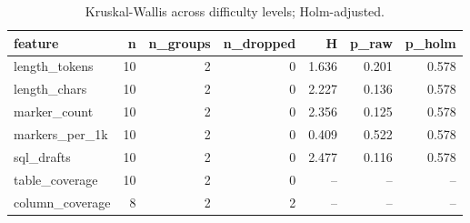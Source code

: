 \begin{table}[htbp]
\caption{Kruskal-Wallis across difficulty levels; Holm-adjusted.}
\label{tab:task2_kruskal}
\begin{tabular}{lrrrrrr}
\toprule
feature & n & n\_groups & n\_dropped & H & p\_raw & p\_holm \\
\midrule
length_tokens & 10 & 2 & 0 & 1.636 & 0.201 & 0.578 \\
length_chars & 10 & 2 & 0 & 2.227 & 0.136 & 0.578 \\
marker_count & 10 & 2 & 0 & 2.356 & 0.125 & 0.578 \\
markers_per_1k & 10 & 2 & 0 & 0.409 & 0.522 & 0.578 \\
sql_drafts & 10 & 2 & 0 & 2.477 & 0.116 & 0.578 \\
table_coverage & 10 & 2 & 0 & -- & -- & -- \\
column_coverage & 8 & 2 & 2 & -- & -- & -- \\
\bottomrule
\end{tabular}
\end{table}
